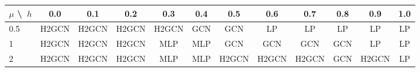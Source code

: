 \begin{tabular}{lccccccccccc}
\toprule
$\mu$ \textbackslash\ $h$ & 0.0 & 0.1 & 0.2 & 0.3 & 0.4 & 0.5 & 0.6 & 0.7 & 0.8 & 0.9 & 1.0 \\
\midrule
0.5 & H2GCN & H2GCN & H2GCN & H2GCN & GCN & GCN & LP & LP & LP & LP & LP \\
1 & H2GCN & H2GCN & H2GCN & MLP & MLP & GCN & GCN & GCN & GCN & LP & LP \\
2 & H2GCN & H2GCN & H2GCN & MLP & MLP & H2GCN & H2GCN & H2GCN & GCN & H2GCN & LP \\
\bottomrule
\end{tabular}